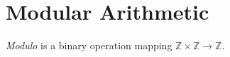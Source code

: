 \lecturechapter

\section*{Modular Arithmetic}

\begin{definition}
    \emph{Modulo} is a binary operation mapping \(\mathbb{Z}\times\mathbb{Z}\longrightarrow\mathbb{Z}\).
\end{definition}